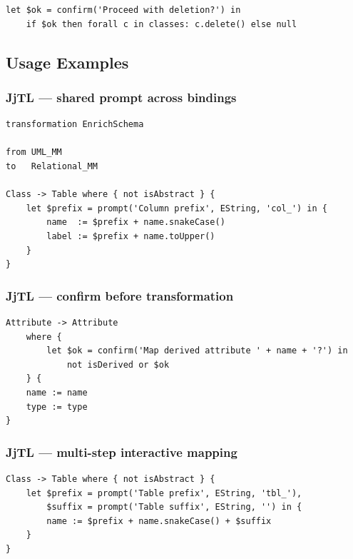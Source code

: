 \documentclass[11pt,a4paper]{article}
\begin{document}
\begin{lstlisting}[style=jjtl,numbers=none]
let $ok = confirm('Proceed with deletion?') in
    if $ok then forall c in classes: c.delete() else null
\end{lstlisting}


\subsection{Usage Examples}

\subsubsection{JjTL --- shared prompt across bindings}

\begin{lstlisting}[style=jjtl,caption={JjLet with block body in JjTL}]
transformation EnrichSchema

from UML_MM
to   Relational_MM

Class -> Table where { not isAbstract } {
    let $prefix = prompt('Column prefix', EString, 'col_') in {
        name  := $prefix + name.snakeCase()
        label := $prefix + name.toUpper()
    }
}
\end{lstlisting}

\subsubsection{JjTL --- confirm before transformation}

\begin{lstlisting}[style=jjtl,caption={JjLet with confirm in a guard}]
Attribute -> Attribute
    where {
        let $ok = confirm('Map derived attribute ' + name + '?') in
            not isDerived or $ok
    } {
    name := name
    type := type
}
\end{lstlisting}

\subsubsection{JjTL --- multi-step interactive mapping}

\begin{lstlisting}[style=jjtl,caption={JjLet with multiple bindings}]
Class -> Table where { not isAbstract } {
    let $prefix = prompt('Table prefix', EString, 'tbl_'),
        $suffix = prompt('Table suffix', EString, '') in {
        name := $prefix + name.snakeCase() + $suffix
    }
}
\end{lstlisting}
\end{document}
